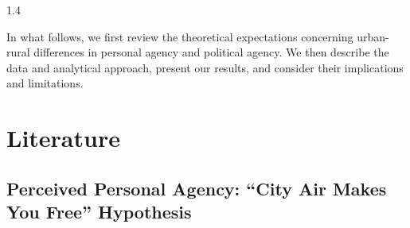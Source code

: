 \documentclass[10pt, letterpaper]{article}
\begin{document}
\begin{spacing}{1.4}

In what follows, we first review the theoretical expectations concerning urban-rural differences in personal agency and political agency. We then describe the data and analytical approach, present our results, and consider their implications and limitations.  
\section{Literature}
\subsection{Perceived Personal Agency: ``City Air Makes You Free'' Hypothesis  %
}
 

\end{spacing}
\end{document}
